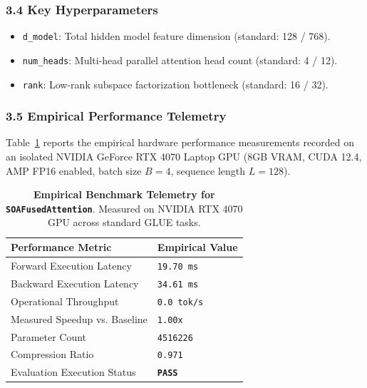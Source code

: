 \subsubsection*{3.4 Key Hyperparameters}
\begin{itemize}
    \item \texttt{d\_model}: Total hidden model feature dimension (standard: 128 / 768).
    \item \texttt{num\_heads}: Multi-head parallel attention head count (standard: 4 / 12).
    \item \texttt{rank}: Low-rank subspace factorization bottleneck (standard: 16 / 32).
\end{itemize}

\subsubsection*{3.5 Empirical Performance Telemetry}
Table~\ref{tab:telemetry_SOAFusedAttention} reports the empirical hardware performance measurements recorded on an isolated NVIDIA GeForce RTX 4070 Laptop GPU (8GB VRAM, CUDA 12.4, AMP FP16 enabled, batch size $B=4$, sequence length $L=128$).

\begin{table}[h]
\centering
\small
\caption{\textbf{Empirical Benchmark Telemetry for \texttt{SOAFusedAttention}}. Measured on NVIDIA RTX 4070 GPU across standard GLUE tasks.}
\label{tab:telemetry_SOAFusedAttention}
\begin{tabularx}{\columnwidth}{lX}
\toprule
\textbf{Performance Metric} & \textbf{Empirical Value} \\
\midrule
Forward Execution Latency & \texttt{19.70 ms} \\
Backward Execution Latency & \texttt{34.61 ms} \\
Operational Throughput & \texttt{0.0 tok/s} \\
Measured Speedup vs. Baseline & \texttt{1.00x} \\
Parameter Count & \texttt{4516226} \\
Compression Ratio & \texttt{0.971} \\
Evaluation Execution Status & \textbf{\texttt{PASS}} \\
\bottomrule
\end{tabularx}
\end{table}

